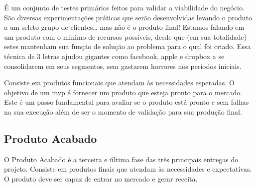     \begin{citacao}
        É um conjunto de testes primários feitos para validar a viabilidade do negócio. São diversas experimentações práticas que serão desenvolvidas levando o produto a um seleto grupo de clientes… mas não é o produto final! Estamos falando em um produto com o mínimo de recursos possíveis, desde que (em sua totalidade) estes mantenham sua função de solução ao problema para o qual foi criado. Essa técnica de 3 letras ajudou gigantes como \gls{facebook}, \gls{apple} e \gls{dropbox} a se consolidarem em seus segmentos, sem gastarem horrores nos períodos iniciais.
        \cite{endeavor2022}
    \end{citacao}
    

    Consiste em produtos funcionais que atendam às necessidades esperadas. O objetivo de um \ac{mvp} é fornecer um produto que esteja pronto para o mercado. Este é um passo fundamental para avaliar se o produto está pronto e sem falhas na sua execução além de ser o momento de validação para sua produção final.
    
    \subsection{Produto Acabado}
    O Produto Acabado é a terceira e última fase das três principais entregas do projeto. Consiste em produtos finais que atendam às necessidades e expectativas. O produto deve ser capaz de entrar no mercado e gerar receita.